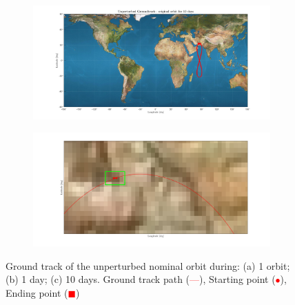 \documentclass{article}
\newcommand{\reddashedline}{\textcolor{red}{---}}
\begin{document}
\begin{figure}[ht]
	\vspace{1cm} %
	\begin{subfigure}[b]{0.45\textwidth}
		\includegraphics[width=\textwidth]{ug10d.png}
		\caption{}
		\label{fig:1c}
	\end{subfigure}
	\hfill
	\begin{subfigure}[b]{0.45\textwidth}
		\includegraphics[width=\textwidth]{ugstartend.png}
		\caption{}
		\label{fig:1d}
	\end{subfigure}
	\caption{Ground track of the unperturbed nominal orbit during: (a) 1 orbit; (b) 1 day; (c) 10 days. Ground track path (\reddashedline), Starting point (\textcolor{red}{$\bullet$}), Ending point (\textcolor{red}{$\blacksquare$})
	}
	
	
\end{figure}
	
\end{document}
